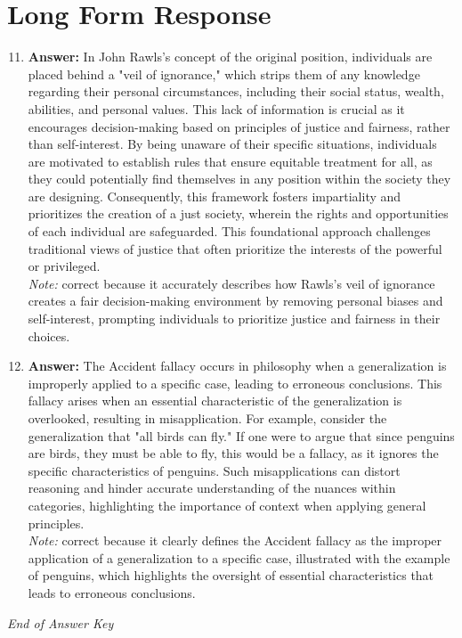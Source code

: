\documentclass[12pt]{article}
\begin{document}
\section*{Long Form Response}
\begin{enumerate}[label=\arabic*.]
\setcounter{enumi}{10}
\item \textbf{Answer:} In John Rawls's concept of the original position, individuals are placed behind a "veil of ignorance," which strips them of any knowledge regarding their personal circumstances, including their social status, wealth, abilities, and personal values. This lack of information is crucial as it encourages decision-making based on principles of justice and fairness, rather than self-interest. By being unaware of their specific situations, individuals are motivated to establish rules that ensure equitable treatment for all, as they could potentially find themselves in any position within the society they are designing. Consequently, this framework fosters impartiality and prioritizes the creation of a just society, wherein the rights and opportunities of each individual are safeguarded. This foundational approach challenges traditional views of justice that often prioritize the interests of the powerful or privileged.
\\ \textit{Note:} correct because it accurately describes how Rawls's veil of ignorance creates a fair decision-making environment by removing personal biases and self-interest, prompting individuals to prioritize justice and fairness in their choices.
\item \textbf{Answer:} The Accident fallacy occurs in philosophy when a generalization is improperly applied to a specific case, leading to erroneous conclusions. This fallacy arises when an essential characteristic of the generalization is overlooked, resulting in misapplication. For example, consider the generalization that "all birds can fly." If one were to argue that since penguins are birds, they must be able to fly, this would be a fallacy, as it ignores the specific characteristics of penguins. Such misapplications can distort reasoning and hinder accurate understanding of the nuances within categories, highlighting the importance of context when applying general principles.
\\ \textit{Note:} correct because it clearly defines the Accident fallacy as the improper application of a generalization to a specific case, illustrated with the example of penguins, which highlights the oversight of essential characteristics that leads to erroneous conclusions.
\end{enumerate}

\vfill
\noindent\textit{End of Answer Key}
\end{document}
